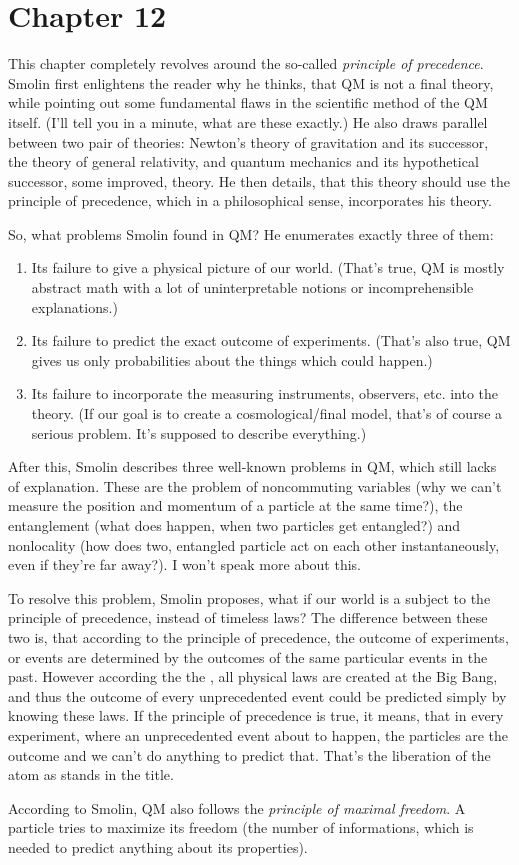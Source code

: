 \section{Chapter 12}
This chapter completely revolves around the so-called \textit{principle of precedence}. Smolin first enlightens the reader why he thinks, that QM is not a final theory, while pointing out some fundamental flaws in the scientific method of the QM itself. (I'll tell you in a minute, what are these exactly.) He also draws parallel between two pair of theories: Newton's theory of gravitation and its successor, the theory of general relativity, and quantum mechanics and its hypothetical successor, some improved,  theory. He then details, that this theory should use the principle of precedence, which in a philosophical sense, incorporates his  theory. \par
So, what problems Smolin found in QM? He enumerates exactly three of them:
\begin{enumerate}
	\item Its failure to give a physical picture of our world. (That's true, QM is mostly abstract math with a lot of uninterpretable notions or incomprehensible explanations.)
	\item Its failure to predict the exact outcome of experiments. (That's also true, QM gives us only probabilities about the things which could happen.)
	\item Its failure to incorporate the measuring instruments, observers, etc. into the theory. (If our goal is to create a cosmological/final model, that's of course a serious problem. It's supposed to describe everything.)
\end{enumerate}
After this, Smolin describes three well-known problems in QM, which still lacks of explanation. These are the problem of noncommuting variables (why we can't measure the position and momentum of a particle at the same time?), the entanglement (what does happen, when two particles get entangled?) and nonlocality (how does two, entangled particle act on each other instantaneously, even if they're far away?). I won't speak more about this. \par
To resolve this problem, Smolin proposes, what if our world is a subject to the principle of precedence, instead of timeless laws? The difference between these two is, that according to the principle of precedence, the outcome of experiments, or events are determined by the outcomes of the same particular events in the past. However according the the , all physical laws are created at the Big Bang, and thus the outcome of every unprecedented event could be predicted simply by knowing these laws. If the principle of precedence is true, it means, that in every experiment, where an unprecedented event about to happen, the particles are  the outcome and we can't do anything to predict that. That's the liberation of the atom as stands in the title. \par
According to Smolin, QM also follows the \textit{principle of maximal freedom}. A particle tries to maximize its freedom (the number of informations, which is needed to predict anything about its properties).
